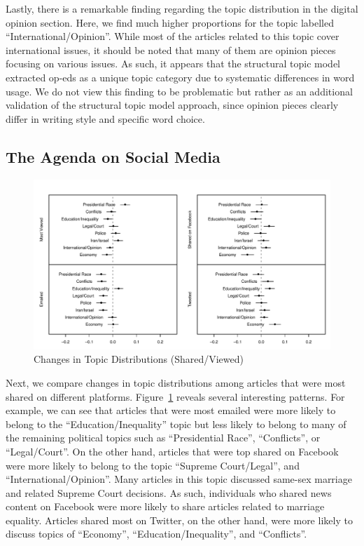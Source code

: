 \documentclass[12pt]{article}
\begin{document}
\begin{doublespace}
Lastly, there is a remarkable finding regarding the topic distribution in the digital opinion section. Here, we find much higher proportions for the topic labelled ``International/Opinion''. While most of the articles related to this topic cover international issues, it should be noted that many of them are opinion pieces focusing on various issues. As such, it appears that the structural topic model extracted op-eds as a unique topic category due to systematic differences in word usage. We do not view this finding to be problematic but rather as an additional validation of the structural topic model approach, since opinion pieces clearly differ in writing style and specific word choice.


\subsection{The Agenda on Social Media}

\begin{figure}
\caption{Changes in Topic Distributions (Shared/Viewed)}\label{fig:res_share_polecon}
\includegraphics[width=\textwidth]{../calc/fig/res_share_polecon}
\end{figure}


Next, we compare changes in topic distributions among articles that were most shared on different platforms. Figure~\ref{fig:res_share_polecon} reveals several interesting patterns. For example, we can see that articles that were most emailed were more likely to belong to the ``Education/Inequality'' topic but less likely to belong to many of the remaining political topics such as ``Presidential Race'', ``Conflicts'', or ``Legal/Court''. On the other hand, articles that were top shared on Facebook were more likely to belong to the topic ``Supreme Court/Legal'', and ``International/Opinion''. Many articles in this topic discussed same-sex marriage and related Supreme Court decisions. As such, individuals who shared news content on Facebook were more likely to share articles related to marriage equality. Articles shared most on Twitter, on the other hand, were more likely to discuss topics of ``Economy'', ``Education/Inequality'', and ``Conflicts''.


\end{doublespace}
\end{document}
